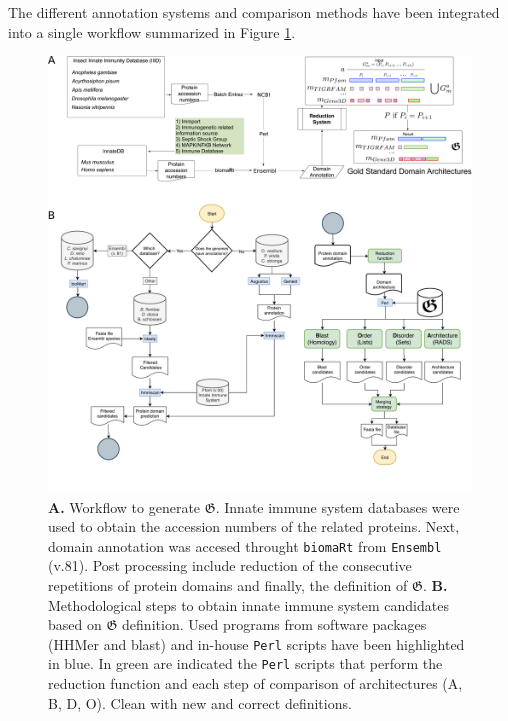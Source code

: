 \documentclass[11pt]{article}
\newcommand{\TODO}[1]{\begingroup\color{red}#1\endgroup}
\begin{document}
The different annotation systems and comparison methods have been integrated 
into a single workflow summarized in Figure \ref{fig:workflow_golden}.

\begin{figure}[htb]
\begin{center}
\includegraphics[scale=0.17]{figures/completeALLWorkflow3}
\caption{\textbf{A.} Workflow to generate $\boldsymbol{\mathfrak{G}}$. Innate 
immune system databases were used to obtain the accession numbers of the 
related proteins. Next, domain annotation was accesed throught \texttt{biomaRt} 
from \texttt{Ensembl} (v.81). Post processing include reduction of the 
consecutive repetitions of protein domains and finally, the definition of 
$\boldsymbol{\mathfrak{G}}$. \textbf{B.} Methodological steps to obtain innate 
immune system candidates based on $\boldsymbol{\mathfrak{G}}$ definition. 
Used programs from software packages (HHMer and blast) and in-house 
\texttt{Perl} scripts have been highlighted in blue. In green are indicated the 
\texttt{Perl} scripts that perform the reduction function and each step of 
comparison of architectures (A, B, D, O). \TODO{Clean with new and correct 
definitions.}}  
\label{fig:workflow_golden}
\end{center}
\end{figure}
\end{document}
